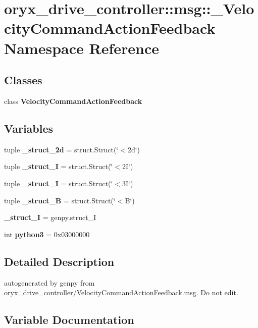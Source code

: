 \section{oryx\-\_\-drive\-\_\-controller\-:\-:msg\-:\-:\-\_\-\-Velocity\-Command\-Action\-Feedback \-Namespace \-Reference}
\label{namespaceoryx__drive__controller_1_1msg_1_1__VelocityCommandActionFeedback}
\subsection*{\-Classes}
\begin{DoxyCompactItemize}
\item 
class {\bf \-Velocity\-Command\-Action\-Feedback}
\end{DoxyCompactItemize}
\subsection*{\-Variables}
\begin{DoxyCompactItemize}
\item 
tuple {\bf \-\_\-struct\-\_\-2d} = struct.\-Struct(\char`\"{}$<$2d\char`\"{})
\item 
tuple {\bf \-\_\-struct\-\_\-I} = struct.\-Struct(\char`\"{}$<$2\-I\char`\"{})
\item 
tuple {\bf \-\_\-struct\-\_\-I} = struct.\-Struct(\char`\"{}$<$3\-I\char`\"{})
\item 
tuple {\bf \-\_\-struct\-\_\-\-B} = struct.\-Struct(\char`\"{}$<$\-B\char`\"{})
\item 
{\bf \-\_\-struct\-\_\-\-I} = genpy.\-struct\-\_\-\-I
\item 
int {\bf python3} = 0x03000000
\end{DoxyCompactItemize}


\subsection{\-Detailed \-Description}
\begin{DoxyVerb}autogenerated by genpy from oryx_drive_controller/VelocityCommandActionFeedback.msg. Do not edit.\end{DoxyVerb}
 

\subsection{\-Variable \-Documentation}
